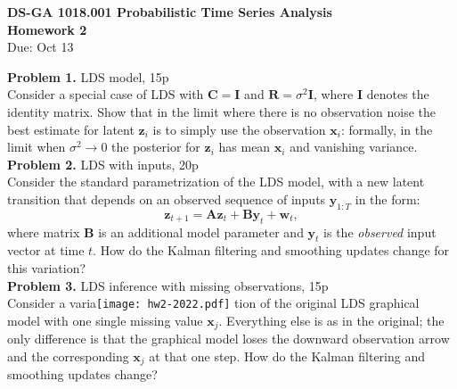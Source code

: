 \documentclass[12pt]{article}
\newcommand{\vect}[1]{\mathbf{#1}}
\begin{document}
\thispagestyle{empty}
\begin{center}

\textbf{DS-GA 1018.001 Probabilistic Time Series Analysis\\
Homework 2}\\
Due: Oct 13
\end{center}

\noindent \textbf{Problem 1.} LDS model, 15p \\ 
Consider a special case of LDS with $\vect{C} = \vect{I}$ and  $\vect{R} = \sigma^2 \vect{I}$, where $\vect{I}$ denotes the identity matrix. 
Show that in the limit where there is no observation noise the best estimate for latent $\vect{z}_i$ is to simply use the observation $\vect{x}_i$: 
formally, in the limit when $\sigma^2 \rightarrow 0$ the posterior for $\vect{z}_i$ has mean $\vect{x}_i$ and vanishing variance.\\
  
 \noindent \textbf{Problem 2. } LDS with inputs, 20p \\
Consider the standard parametrization of the LDS model, with a new latent transition that depends on an observed sequence of inputs $\mathbf{y}_{1:T}$ in the form:
$$\mathbf{z}_{t+1} = \mathbf{A}\mathbf{z}_{t} +  \mathbf{B}\mathbf{y}_{t} +  \mathbf{w}_{t} , $$ 
where matrix  $\mathbf{B}$ is an additional model parameter and $\mathbf{y}_{t}$ is the \emph{observed} input vector at time $t$.
How do the Kalman filtering and smoothing updates change for this variation?\\

\noindent \textbf{Problem 3.} LDS inference with missing observations, 15p \\
Consider a varia\texttt{[image: hw2-2022.pdf]}
tion of the original LDS graphical model with one single missing value $\mathbf{x}_j$. 
Everything else is as in the original; the only difference is that the graphical model loses the downward observation arrow and the corresponding $\mathbf{x}_j$ at that one step.
How do the Kalman filtering and smoothing updates change?\\
\end{document}
